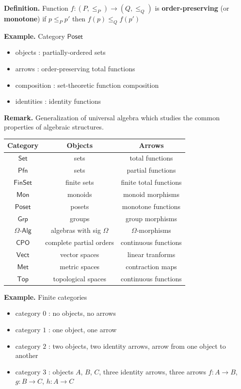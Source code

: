\documentclass[10pt,landscape,a4paper]{article}
\begin{document}
\begin{multicols}{3}
\textbf{Definition.} Function $f : (P, \leq_P) \rightarrow (Q, \leq_Q)$ is \textbf{order-preserving} (or \textbf{monotone}) if $p \leq_P p'$ then $f(p) \leq_Q f(p')$

\textbf{Example.} Category $\mathsf{Poset}$
\begin{itemize}\setlength{\itemsep}{-0.7mm}
\item objects : partially-ordered sets
\item arrows : order-preserving total functions
\item composition : set-theoretic function composition
\item identities : identity functions
\end{itemize}

\textbf{Remark.} Generalization of universal algebra which studies the common properties of algebraic structures.

\begin{tabular}{|c|c|c|}
  \hline
  \textbf{Category} & \textbf{Objects} & \textbf{Arrows} \\ \hline \hline
  $\mathsf{Set}$        & sets                             & total functions \\ 
  $\mathsf{Pfn}$        & sets                             & partial functions\\
  $\mathsf{FinSet}$     & finite sets                      & finite total functions\\
  $\mathsf{Mon}$        & monoids                          & monoid morphisms\\
  $\mathsf{Poset}$      & posets                           & monotone functions\\
  $\mathsf{Grp}$        & groups                           & group morphisms\\
  $\Omega\text{-}\mathsf{Alg}$ & algebras with sig $\Omega$       & $\Omega$-morphisms\\
  $\mathsf{CPO}$        & complete partial orders          & continuous functions\\
  $\mathsf{Vect}$       & vector spaces                    & linear tranforms\\
  $\mathsf{Met}$        & metric spaces                    & contraction maps\\
  $\mathsf{Top}$        & topological spaces               & continuous functions\\ \hline
\end{tabular}

\textbf{Example.} Finite categories
\begin{itemize}\setlength{\itemsep}{-0.7mm}
\item category $0$ : no objects, no arrows
\item category $1$ : one object, one arrow
\item category $2$ : two objects, two identity arrows, arrow from one object to another
\item category $3$ : objects $A$, $B$, $C$, three identity arrows, three arrows $f : A \rightarrow B$, $g : B \rightarrow C$, $h : A \rightarrow C$
\end{itemize}


\end{multicols}
\end{document}
